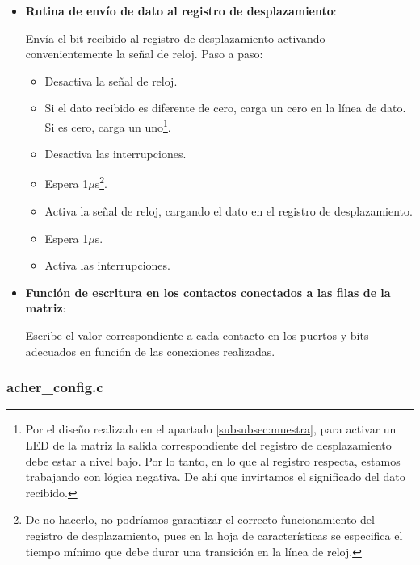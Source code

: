 \begin{itemize}
\item{\textbf{Rutina de envío de dato al registro de desplazamiento}:
  

  Envía el bit recibido al registro de desplazamiento activando convenientemente la señal de reloj. Paso a paso:
  \begin{itemize}
     \item{Desactiva la señal de reloj.}
     \item{Si el dato recibido es diferente de cero, carga un cero en la línea de dato. Si es cero, carga un uno\footnote{Por el diseño realizado en el apartado \ref{subsubsec:muestra}, para activar un LED de la matriz la salida correspondiente del registro de desplazamiento debe estar a nivel bajo. Por lo tanto, en lo que al registro respecta, estamos trabajando con lógica negativa. De ahí que invirtamos el significado del dato recibido.}.}
     \item{Desactiva las interrupciones.}
     \item{Espera 1$\mu$s\footnote{De no hacerlo, no podríamos garantizar el correcto funcionamiento del registro de desplazamiento, pues en la hoja de características\cite{164} se especifica el tiempo mínimo que debe durar una transición en la línea de reloj.}.}
     \item{Activa la señal de reloj, cargando el dato en el registro de desplazamiento.}
     \item{Espera 1$\mu$s.}
     \item{Activa las interrupciones.}
   \end{itemize}
}

\item{\textbf{Función de escritura en los contactos conectados a las filas de la matriz}:
  

  Escribe el valor correspondiente a cada contacto en los puertos y bits adecuados en función de las conexiones realizadas.
}
\end{itemize}

\subsubsection{acher\_config.c}

